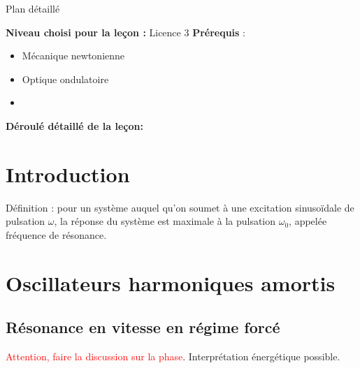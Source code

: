 \begin{reportBlock}{Plan détaillé}

  \textbf{Niveau choisi pour la leçon :} Licence 3
  \newline
  \textbf{Prérequis} : \begin{itemize}
      \item Mécanique newtonienne
      \item Optique ondulatoire
      \item 
  \end{itemize}

  \textbf{Déroulé détaillé de la leçon: }  
  
  \section*{Introduction}
Définition : pour un système auquel qu'on soumet à une excitation sinusoïdale de pulsation $\omega$, la réponse du système est maximale à la pulsation $\omega_0$, appelée fréquence de résonance.
  \section{Oscillateurs harmoniques amortis}
  \subsection{Résonance en vitesse en régime forcé} 
\textcolor{red}{Attention, faire la discussion sur la phase}. Interprétation énergétique possible.

\end{reportBlock}
